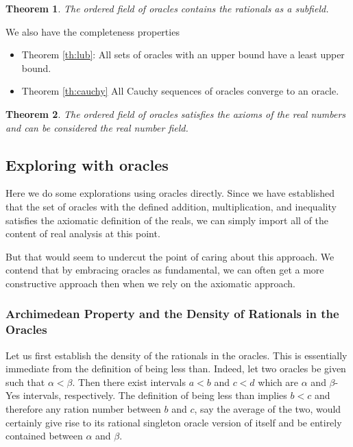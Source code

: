 \documentclass[12pt]{article}
\newtheorem{theorem}{Theorem}
\theoremstyle{remark}
\begin{document}
\begin{theorem}
The ordered field of oracles contains the rationals as a subfield. 
\end{theorem}

We also have the completeness properties

\begin{itemize}
    \item  Theorem \ref{th:lub}: All sets of oracles with an upper bound have a least upper bound. 
    \item Theorem \ref{th:cauchy} All Cauchy sequences of oracles converge to an oracle. 
\end{itemize}

\begin{theorem}
The ordered field of oracles satisfies the axioms of the real numbers and can be considered the real number field. 
\end{theorem}

\subsection{Exploring with oracles}

Here we do some explorations using oracles directly. Since we have established that the set of oracles with the defined addition, multiplication, and inequality satisfies the axiomatic definition of the reals, we can simply import all of the content of real analysis at this point. 

But that would seem to undercut the point of caring about this approach. We contend that by embracing oracles as fundamental, we can often get a more constructive approach then when we rely on the axiomatic approach. 

\subsubsection{Archimedean Property and the Density of Rationals in the Oracles}

Let us first establish the density of the rationals in the oracles. This is essentially immediate from the definition of being less than. Indeed, let two oracles be given such that $\alpha < \beta$. Then there exist intervals $a<b$ and $c<d$ which are $\alpha$ and $\beta$-Yes intervals, respectively. The definition of being less than implies $b < c$ and therefore any ration number between $b$ and $c$, say the average of the two, would certainly give rise to its rational singleton oracle version of itself and be entirely contained between $\alpha$ and $\beta$.
\end{document}
